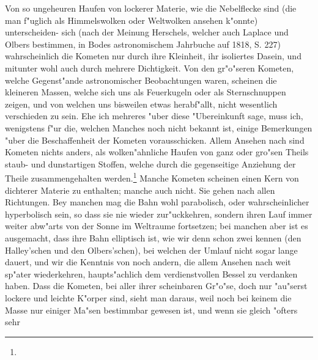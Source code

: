 \documentclass[a4paper, 11pt, oneside, polutonikogreek, german]{article}
\begin{document}
Von so ungeheuren Haufen von lockerer Materie, wie die Nebelflecke sind (die man f"uglich als Himmelswolken oder Weltwolken ansehen k"onnte) unterscheiden- sich (nach der Meinung Herschels, welcher auch Laplace und Olbers bestimmen, in Bodes astronomischem Jahrbuche auf 1818, S. 227) wahrscheinlich die Kometen nur durch ihre Kleinheit, ihr isoliertes Dasein, und mitunter wohl auch durch mehrere Dichtigkeit. Von den gr"o"seren Kometen, welche Gegenst"ande astronomischer Beobachtungen waren, scheinen die kleineren Massen, welche sich uns als Feuerkugeln oder als Sternschnuppen zeigen, und von welchen uns bisweilen etwas herabf"allt, nicht wesentlich verschieden zu sein. Ehe ich mehreres "uber diese "Ubereinkunft sage, muss ich, wenigstens f"ur die, welchen Manches noch nicht bekannt ist, einige Bemerkungen "uber die Beschaffenheit der Kometen vorausschicken. Allem Ansehen nach sind Kometen nichts anders, als wolken"ahnliche Haufen von ganz oder gro"sen Theils staub- und dunstartigen Stoffen, welche durch die gegenseitige Anziehung der Theile zusammengehalten werden.\footnote{} Manche Kometen scheinen einen Kern von dichterer Materie zu enthalten; manche auch nicht. Sie gehen nach allen Richtungen. Bey manchen mag die Bahn wohl parabolisch, oder wahrscheinlicher hyperbolisch sein, so dass sie nie wieder zur"uckkehren, sondern ihren Lauf immer weiter abw"arts von der Sonne im Weltraume fortsetzen; bei manchen aber ist es ausgemacht, dass ihre Bahn elliptisch ist, wie wir denn schon zwei kennen (den Halley'schen und den Olbers'schen), bei welchen der Umlauf nicht sogar lange dauert, und wir die Kenntnis von noch andern, die allem Ansehen nach weit sp"ater wiederkehren, haupts"achlich dem verdienstvollen Bessel zu verdanken haben. Dass die Kometen, bei aller ihrer scheinbaren Gr"o"se, doch nur "au"serst lockere und leichte K"orper sind, sieht man daraus, weil noch bei keinem die Masse nur einiger Ma"sen bestimmbar gewesen ist, und wenn sie gleich "ofters sehr 
\end{document}
